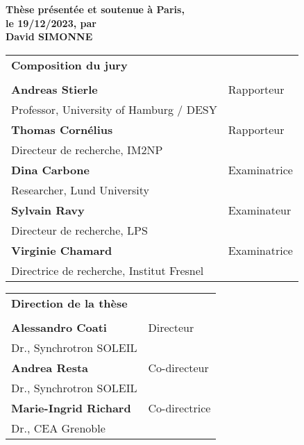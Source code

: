 \begin{titlepage}
\textbf{Thèse présentée et soutenue à Paris,\\ le 19/12/2023, par}\\
\bigskip
\Large {\color{Prune} \textbf{David SIMONNE}}

\vspace{\fill} %

\bigskip
\flushleft
\scriptsize
\begin{tabular}{|p{7cm}l}
\arrayrulecolor{Prune}
{\footnotesize \textbf{Composition du jury}}\\
& \\
\textbf{Andreas Stierle} & Rapporteur \\
Professor, University of Hamburg / DESY & \\
\textbf{Thomas Cornélius} & Rapporteur \\
Directeur de recherche, IM2NP & \\
\textbf{Dina Carbone} & Examinatrice \\
Researcher, Lund University & \\
\textbf{Sylvain Ravy} & Examinateur \\
Directeur de recherche, LPS & \\
\textbf{Virginie Chamard} & Examinatrice \\
Directrice de recherche, Institut Fresnel & \\

\end{tabular} 

\medskip
\begin{tabular}{|p{7cm}l}
\arrayrulecolor{Prune}
{\footnotesize \textbf{Direction de la thèse}}\\
& \\
\textbf{Alessandro Coati} & Directeur \\
Dr., Synchrotron SOLEIL & \\
\textbf{Andrea Resta} & Co-directeur \\
Dr., Synchrotron SOLEIL & \\
\textbf{Marie-Ingrid Richard} & Co-directrice \\
Dr., CEA Grenoble & \\

\end{tabular} 

\end{titlepage}